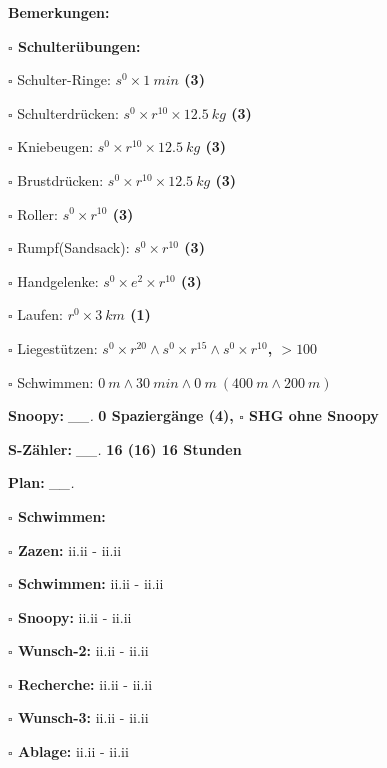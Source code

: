 \documentclass[10pt,a4paper]{article}
\newcommand\prop[1] {{\color {alizarin} {\bf #1}}}             %
\newcommand\rewo[1] {{\color {aqua} {\bf #1}}}                 %
\newcommand\mand[1] {{\color {burntorange} {\bf #1}}}          %
\newcommand\topspace{\vskip -15pt \hskip 20pt}
\newcommand\bottomspace{\vskip 4pt}
\newcommand\n[1] { {\sl #1.} \hskip 5pt }
\begin{document}
\begin{mdframed}[style=daystyle]
\begin{labeling}{{\mand {Bemerkungen:}}}
\begin{minipage}{0.75\textwidth}
\begin{labeling}{\prop {$\square$ {Schulterübungen:}}}
      \item[$\square$ Schulter-Ringe:]  {\prop {$s^0 \times 1\ min$ (3)}}
      \item[$\square$ Schulterdrücken:] {\prop {$s^0 \times r^{10} \times 12.5\ kg$ (3)}}
      \item[$\square$ Kniebeugen:]      {\prop {$s^0 \times r^{10} \times 12.5\ kg$ (3)}}
      \item[$\square$ Brustdrücken:]    {\prop {$s^0 \times r^{10} \times 12.5\ kg$ (3)}}
      \item[$\square$ Roller:]          {\prop {$s^0 \times r^{10}$ (3)}}
      \item[$\square$ Rumpf(Sandsack):] {\prop {$s^0 \times r^{10}$ (3)}}
      \item[$\square$ Handgelenke:]     {\prop {$s^0 \times e^2 \times r^{10}$ (3)}}
      \item[$\square$ Laufen:]          {\prop {$r^0 \times 3\ km$ (1)}}
      \item[$\square$ Liegestützen:]    {\prop {$s^0 \times r^{20} \land s^0 \times r^{15} \land s^0 \times r^{10}$, $> 100$}}
      \item[$\square$ Schwimmen:]       {\prop {$0\ m \land 30\ min \land 0\ m\ (400\ m \land 200\ m)$}}
      \end{labeling}
    \end{minipage}
    \bottomspace        
  \item[{\mand {Snoopy:}}]       \n{\_\_} {\prop {0 Spaziergänge (4), $\square$ SHG ohne Snoopy}}    
  \item[{\mand {S-Zähler:}}]    \n{\_\_} {\rewo {16 (16) 16 Stunden}}
  \item[{\mand {Plan:}}]         \n{\_\_}
    \topspace
    \begin{minipage}{0.75\textwidth}  
      \begin{labeling}{\prop {$\square$ {Schwimmen:}}} 
        \setlength\itemsep{-3pt}
      \item[{\prop {$\square$ Zazen:}}]      ii.ii - ii.ii        
      \item[{\prop {$\square$ Schwimmen:}}]  ii.ii - ii.ii
      \item[{\prop {$\square$ Snoopy:}}]     ii.ii - ii.ii
      \item[{\prop {$\square$ Wunsch-2:}}]   ii.ii - ii.ii
      \item[{\prop {$\square$ Recherche:}}]  ii.ii - ii.ii
      \item[{\prop {$\square$ Wunsch-3:}}]   ii.ii - ii.ii
      \item[{\prop {$\square$ Ablage:}}]     ii.ii - ii.ii

\end{labeling}
\end{minipage}
\end{labeling}
\end{mdframed}
\end{document}
